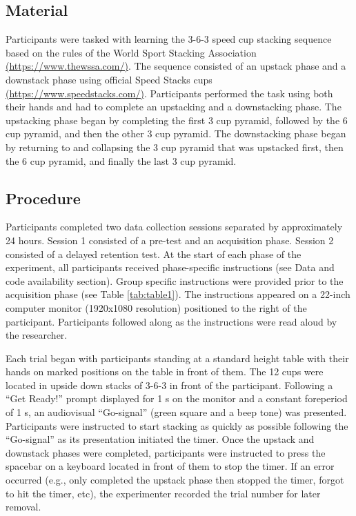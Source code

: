 \documentclass[
  english,
  jou]{apa7}
\begin{document}
\hypertarget{material}{%
\subsection{Material}\label{material}}

Participants were tasked with learning the 3-6-3 speed cup stacking sequence based on the rules of the World Sport Stacking Association \href{https://www.thewssa.com/}{(https://www.thewssa.com/)}. The sequence consisted of an upstack phase and a downstack phase using official Speed Stacks cups \href{https://www.speedstacks.com/}{(https://www.speedstacks.com/)}. Participants performed the task using both their hands and had to complete an upstacking and a downstacking phase. The upstacking phase began by completing the first 3 cup pyramid, followed by the 6 cup pyramid, and then the other 3 cup pyramid. The downstacking phase began by returning to and collapsing the 3 cup pyramid that was upstacked first, then the 6 cup pyramid, and finally the last 3 cup pyramid.

\hypertarget{procedure}{%
\subsection{Procedure}\label{procedure}}

Participants completed two data collection sessions separated by approximately 24 hours. Session 1 consisted of a pre-test and an acquisition phase. Session 2 consisted of a delayed retention test. At the start of each phase of the experiment, all participants received phase-specific instructions (see Data and code availability section). Group specific instructions were provided prior to the acquisition phase (see Table \ref{tab:table1}). The instructions appeared on a 22-inch computer monitor (1920x1080 resolution) positioned to the right of the participant. Participants followed along as the instructions were read aloud by the researcher.

Each trial began with participants standing at a standard height table with their hands on marked positions on the table in front of them. The 12 cups were located in upside down stacks of 3-6-3 in front of the participant. Following a ``Get Ready!'' prompt displayed for 1 s on the monitor and a constant foreperiod of 1 s, an audiovisual ``Go-signal'' (green square and a beep tone) was presented. Participants were instructed to start stacking as quickly as possible following the ``Go-signal'' as its presentation initiated the timer. Once the upstack and downstack phases were completed, participants were instructed to press the spacebar on a keyboard located in front of them to stop the timer. If an error occurred (e.g., only completed the upstack phase then stopped the timer, forgot to hit the timer, etc), the experimenter recorded the trial number for later removal.
\end{document}
